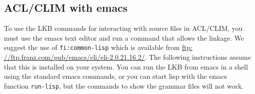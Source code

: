 \documentclass[12pt]{report}
\newcommand{\functionname}[1]{{\tt #1}}
\begin{document}
\subsection{ACL/CLIM with emacs}
\label{acl-emacs}

To use the LKB commands for interacting with source files in ACL/CLIM, you must
use the emacs text editor and run a command that allows the linkage.  We
suggest the use of \functionname{fi:common-lisp} which is available from
\href{ftp: //ftp.franz.com/pub/emacs/eli/eli-2.0.21.16.2/}{ftp:
//ftp.franz.com/pub/emacs/eli/eli-2.0.21.16.2/}.  The following instructions
assume that this is installed on your system.  You can run the LKB from emacs
in a shell using the standard emacs commands, or you can start lisp with the
emacs function \functionname{run-lisp}, but the commands to show the grammar
files will not work.
\end{document}
